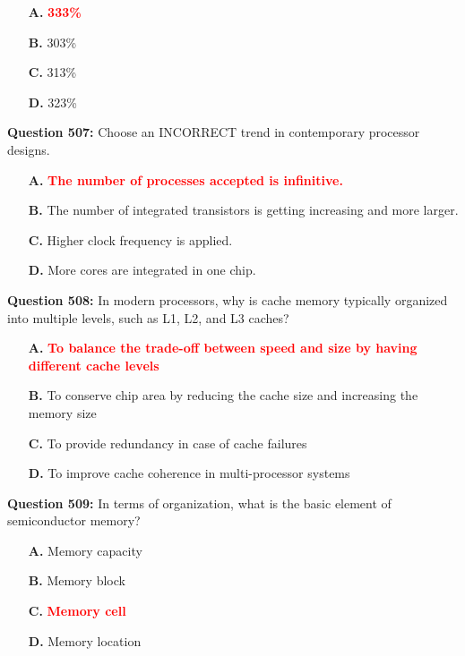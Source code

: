 \documentclass[12pt,a4paper]{article}
\begin{document}
\begin{itemize}
    \item[\textbf{A.}] \textcolor{red}{\textbf{333\%}}
    \item[\textbf{B.}] 303\%
    \item[\textbf{C.}] 313\%
    \item[\textbf{D.}] 323\%
\end{itemize}

\vspace{0.5cm}

\textbf{Question 507:} Choose an INCORRECT trend in contemporary processor designs.

\begin{itemize}
    \item[\textbf{A.}] \textcolor{red}{\textbf{The number of processes accepted is infinitive.}}
    \item[\textbf{B.}] The number of integrated transistors is getting increasing and more larger.
    \item[\textbf{C.}] Higher clock frequency is applied.
    \item[\textbf{D.}] More cores are integrated in one chip.
\end{itemize}

\vspace{0.5cm}

\textbf{Question 508:} In modern processors, why is cache memory typically organized into multiple levels, such as L1, L2, and L3 caches?

\begin{itemize}
    \item[\textbf{A.}] \textcolor{red}{\textbf{To balance the trade-off between speed and size by having different cache levels}}
    \item[\textbf{B.}] To conserve chip area by reducing the cache size and increasing the memory size
    \item[\textbf{C.}] To provide redundancy in case of cache failures
    \item[\textbf{D.}] To improve cache coherence in multi-processor systems
\end{itemize}

\vspace{0.5cm}

\textbf{Question 509:} In terms of organization, what is the basic element of semiconductor memory?

\begin{itemize}
    \item[\textbf{A.}] Memory capacity
    \item[\textbf{B.}] Memory block
    \item[\textbf{C.}] \textcolor{red}{\textbf{Memory cell}}
    \item[\textbf{D.}] Memory location
\end{itemize}
\end{document}
